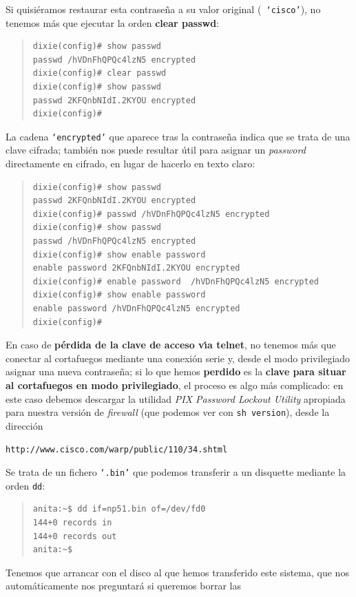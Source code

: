 Si quisi\'eramos restaurar esta contrase\~na a su valor original ({\tt 
`cisco'}), no tenemos m\'as que ejecutar la orden {\bf clear passwd}:
\begin{quote}
\begin{verbatim}
dixie(config)# show passwd
passwd /hVDnFhQPQc4lzN5 encrypted
dixie(config)# clear passwd
dixie(config)# show passwd
passwd 2KFQnbNIdI.2KYOU encrypted
dixie(config)#
\end{verbatim}
\end{quote}
La cadena {\tt `encrypted'} que aparece tras la contrase\~na indica que se trata de una clave cifrada; tambi\'en nos puede resultar
\'util para asignar un {\it password} directamente en cifrado, en lugar de hacerlo en texto claro:
\begin{quote}
\begin{verbatim}
dixie(config)# show passwd
passwd 2KFQnbNIdI.2KYOU encrypted
dixie(config)# passwd /hVDnFhQPQc4lzN5 encrypted
dixie(config)# show passwd
passwd /hVDnFhQPQc4lzN5 encrypted
dixie(config)# show enable password
enable password 2KFQnbNIdI.2KYOU encrypted
dixie(config)# enable password  /hVDnFhQPQc4lzN5 encrypted
dixie(config)# show enable password
enable password /hVDnFhQPQc4lzN5 encrypted
dixie(config)#
\end{verbatim}
\end{quote}
En caso de {\bf p\'erdida de la clave de acceso v\'{\i}a telnet}, no tenemos
m\'as que conectar al cortafuegos mediante una conexi\'on serie y, desde el
modo privilegiado asignar una nueva contrase\~na; si lo que hemos {\bf perdido} 
es la {\bf clave para situar al cortafuegos en modo privilegiado}, el proceso 
es algo m\'as complicado: en este caso debemos descargar la utilidad {\it PIX 
Password Lockout Utility} apropiada para nuestra versi\'on de {\it firewall} 
(que podemos ver con {\tt sh version}), desde la direcci\'on
\begin{center}
{\tt http://www.cisco.com/warp/public/110/34.shtml}
\end{center}
Se trata de un fichero {\tt `.bin'} que podemos transferir a un disquette 
mediante la orden {\tt dd}:
\begin{quote}
\begin{verbatim}
anita:~$ dd if=np51.bin of=/dev/fd0
144+0 records in
144+0 records out
anita:~$ 
\end{verbatim}
\end{quote}
Tenemos que arrancar con el disco al que hemos transferido este 
sistema, que nos autom\'aticamente nos preguntar\'a si queremos borrar las
